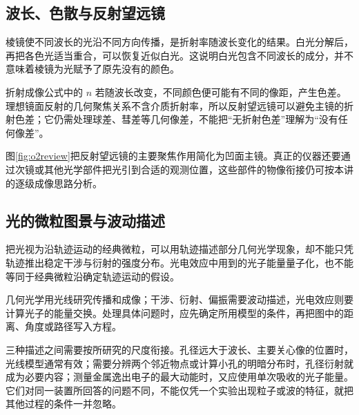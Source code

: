 \subsection{波长、色散与反射望远镜}

棱镜使不同波长的光沿不同方向传播，是折射率随波长变化的结果。白光分解后，再把各色光适当重合，可以恢复近似白光。这说明白光包含不同波长的成分，并不意味着棱镜为光赋予了原先没有的颜色。

折射成像公式中的 \(n\) 若随波长改变，不同颜色便可能有不同的像距，产生色差。理想镜面反射的几何聚焦关系不含介质折射率，所以反射望远镜可以避免主镜的折射色差；它仍需处理球差、彗差等几何像差，不能把“无折射色差”理解为“没有任何像差”。

图\ref{fig:o2review}把反射望远镜的主要聚焦作用简化为凹面主镜。真正的仪器还要通过次镜或其他光学部件把光引到合适的观测位置，这些部件的物像衔接仍可按本讲的逐级成像思路分析。

\subsection{光的微粒图景与波动描述}

把光视为沿轨迹运动的经典微粒，可以用轨迹描述部分几何光学现象，却不能只凭轨迹推出稳定干涉与衍射的强度分布。光电效应中用到的光子能量量子化，也不能等同于经典微粒沿确定轨迹运动的假设。

几何光学用光线研究传播和成像；干涉、衍射、偏振需要波动描述，光电效应则要计算光子的能量交换。处理具体问题时，应先确定所用模型的条件，再把图中的距离、角度或路径写入方程。

三种描述之间需要按所研究的尺度衔接。孔径远大于波长、主要关心像的位置时，光线模型通常有效；需要分辨两个邻近物点或计算小孔的明暗分布时，孔径衍射就成为必要内容；测量金属逸出电子的最大动能时，又应使用单次吸收的光子能量。它们对同一装置所回答的问题不同，不能仅凭一个实验出现粒子或波的特征，就把其他过程的条件一并忽略。
